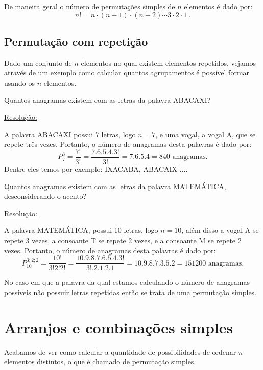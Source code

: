 De maneira geral o número de permutações simples de $n$ elementos é dado por:
\[n!= n \cdot (n-1) \cdot (n-2) \cdots 3 \cdot 2 \cdot 1 \ .\]



\subsection{Permutação com repetição}

Dado um conjunto de $n$ elementos no qual existem elementos repetidos, vejamos através de um exemplo como calcular quantos agrupamentos é possível formar usando os $n$ elementos.

\begin{exem}
 Quantos anagramas existem com as letras da palavra ABACAXI?

 \underline{Resolução:}

 A palavra ABACAXI possui 7 letras, logo $n=7$, e uma vogal, a vogal A, que se repete três vezes. Portanto, o número de anagramas desta palavras é dado por:
 \[P_{7}^{3}= \frac{7!}{3!}= \frac{7.6.5.4.3!}{3!}= 7.6.5.4= 840 \text{ anagramas.}\]
 Dentre eles temos por exemplo: IXACABA, ABACAIX ....
\end{exem}

\begin{exem}
 Quantos anagramas existem com as letras da palavra MATEMÁTICA, desconsiderando o acento?

 \underline{Resolução:}

 A palavra MATEMÁTICA, possui 10 letras, logo $n=10$, além disso a vogal A se repete 3 vezes, a consoante T se repete 2 vezes, e a consoante M se repete 2 vezes. Portanto, o número de anagramas desta palavras é dado por:
 \[P_{10}^{3;2;2}= \frac{10!}{3!2!2!}= \frac{10.9.8.7.6.5.4.3!}{3!.2.1.2.1}= 10.9.8.7.3.5.2= 151200 \text{ anagramas.} \]

\end{exem}

\begin{obs}
 No caso em que a palavra da qual estamos calculando o número de anagramas possíveis não possuir letras repetidas então se trata de uma permutação simples.
\end{obs}

\section{Arranjos e combinações simples}

Acabamos de ver como calcular a quantidade de possibilidades de ordenar $n$ elementos distintos, o que é chamado de permutação simples.

